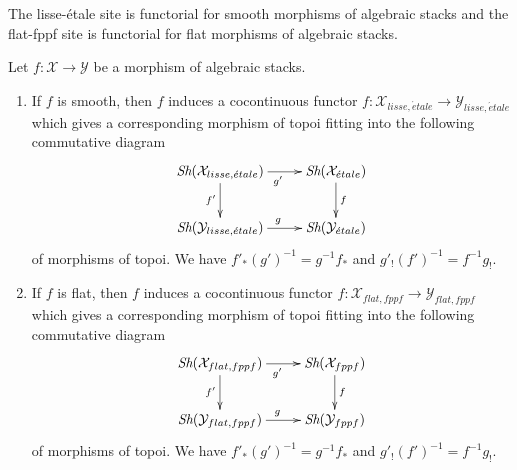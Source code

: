\noindent
The lisse-\'etale site is functorial for smooth morphisms of algebraic stacks
and the flat-fppf site is functorial for flat morphisms of algebraic stacks.

\begin{lemma}
\label{lemma-lisse-etale-functorial}
Let $f : \mathcal{X} \to \mathcal{Y}$ be a morphism of algebraic stacks.
\begin{enumerate}
\item If $f$ is smooth, then $f$ induces a cocontinuous functor
$f : \mathcal{X}_{lisse,\acute{e}tale} \to \mathcal{Y}_{lisse,\acute{e}tale}$
which gives a corresponding morphism of topoi fitting into the following
commutative diagram
$$
\xymatrix{
\Sh(\mathcal{X}_{lisse,\acute{e}tale}) \ar[r]_{g'} \ar[d]_{f'} &
\Sh(\mathcal{X}_{\acute{e}tale}) \ar[d]^f \\
\Sh(\mathcal{Y}_{lisse,\acute{e}tale}) \ar[r]^g &
\Sh(\mathcal{Y}_{\acute{e}tale})
}
$$
of morphisms of topoi. We have $f'_*(g')^{-1} = g^{-1}f_*$ and
$g'_!(f')^{-1} = f^{-1}g_!$.
\item If $f$ is flat, then $f$ induces a cocontinuous functor
$f : \mathcal{X}_{flat,fppf} \to \mathcal{Y}_{flat,fppf}$
which gives a corresponding morphism of topoi fitting into the following
commutative diagram
$$
\xymatrix{
\Sh(\mathcal{X}_{flat,fppf}) \ar[r]_{g'} \ar[d]_{f'} &
\Sh(\mathcal{X}_{fppf}) \ar[d]^f \\
\Sh(\mathcal{Y}_{flat,fppf}) \ar[r]^g &
\Sh(\mathcal{Y}_{fppf})
}
$$
of morphisms of topoi. We have $f'_*(g')^{-1} = g^{-1}f_*$ and
$g'_!(f')^{-1} = f^{-1}g_!$.
\end{enumerate}
\end{lemma}

